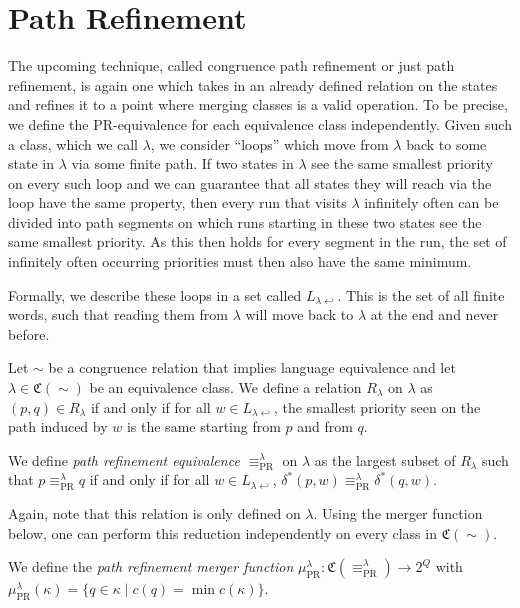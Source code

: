 
\section{Path Refinement}

The upcoming technique, called congruence path refinement or just path refinement, is again one which takes in an already defined relation on the states and refines it to a point where merging classes is a valid operation. To be precise, we define the PR-equivalence for each equivalence class independently. 
Given such a class, which we call $\lambda$, we consider \enquote{loops} which move from $\lambda$ back to some state in $\lambda$ via some finite path. If two states in $\lambda$ see the same smallest priority on every such loop and we can guarantee that all states they will reach via the loop have the same property, then every run that visits $\lambda$ infinitely often can be divided into path segments on which runs starting in these two states see the same smallest priority. As this then holds for every segment in the run, the set of infinitely often occurring priorities must then also have the same minimum.

Formally, we describe these loops in a set called $L_{\lambda \hookleftarrow}$. This is the set of all finite words, such that reading them from $\lambda$ will move back to $\lambda$ at the end and never before.

\begin{definition}
	Let $\sim$ be a congruence relation that implies language equivalence and let $\lambda \in \mathfrak{C}(\sim)$ be an equivalence class. We define a relation $R_\lambda$ on $\lambda$ as $(p, q) \in R_\lambda$ if and only if for all $w \in L_{\lambda \hookleftarrow}$, the smallest priority seen on the path induced by $w$ is the same starting from $p$ and from $q$.
	
	We define \emph{path refinement equivalence} $\equiv_\text{PR}^\lambda$ on $\lambda$ as the largest subset of $R_\lambda$ such that $p \equiv_\text{PR}^\lambda q$ if and only if for all $w \in L_{\lambda \hookleftarrow}$, $\delta^*(p, w) \equiv_\text{PR}^\lambda \delta^*(q, w)$.
\end{definition}

Again, note that this relation is only defined on $\lambda$. Using the merger function below, one can perform this reduction independently on every class in $\mathfrak{C}(\sim)$. 

\begin{definition}
	We define the \emph{path refinement merger function} $\mu_\text{PR}^\lambda : \mathfrak{C}(\equiv_\text{PR}^\lambda) \rightarrow 2^Q$ with $\mu_\text{PR}^\lambda(\kappa) = \{q \in \kappa \mid c(q) = \min c(\kappa) \}$.
\end{definition}

